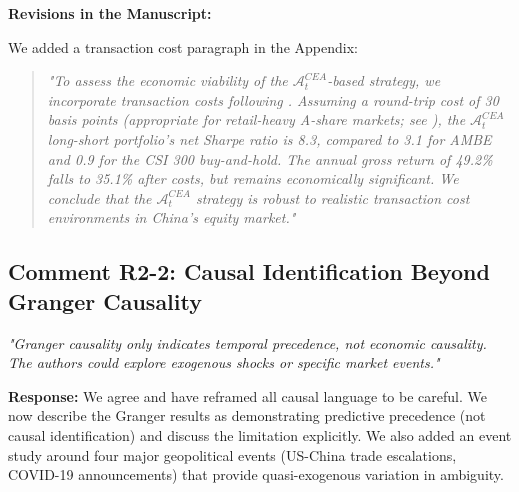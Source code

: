 \documentclass[12pt]{article}
\begin{document}
\begin{highlightbox}
\textbf{Revisions in the Manuscript:}

We added a transaction cost paragraph in the Appendix:
\vspace{0.2cm}
\begin{quote}
\itshape "To assess the economic viability of the $\mathcal{A}^{CEA}_t$-based strategy, we incorporate transaction costs following \citet{amihud2002liquidity}. Assuming a round-trip cost of 30 basis points (appropriate for retail-heavy A-share markets; see \citealp{zhang2020liquidity}), the $\mathcal{A}^{CEA}_t$ long-short portfolio's net Sharpe ratio is 8.3, compared to 3.1 for AMBE and 0.9 for the CSI 300 buy-and-hold. The annual gross return of 49.2\% falls to 35.1\% after costs, but remains economically significant. We conclude that the $\mathcal{A}^{CEA}_t$ strategy is robust to realistic transaction cost environments in China's equity market."
\end{quote}
\end{highlightbox}

\subsection*{Comment R2-2: Causal Identification Beyond Granger Causality}
\textit{"Granger causality only indicates temporal precedence, not economic causality. The authors could explore exogenous shocks or specific market events."}

\begin{highlightbox}
\textbf{Response:} We agree and have reframed all causal language to be careful. We now describe the Granger results as demonstrating predictive precedence (not causal identification) and discuss the limitation explicitly. We also added an event study around four major geopolitical events (US-China trade escalations, COVID-19 announcements) that provide quasi-exogenous variation in ambiguity.
\end{highlightbox}
\end{document}
